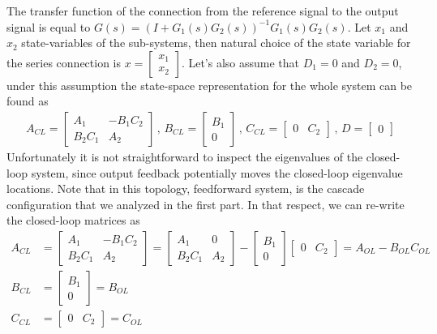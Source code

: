 \documentclass[twoside]{article}
\begin{document}
The transfer function of the connection from the reference signal to the output signal is equal to 
$G(s) = \left( I + G_1(s) G_2(s) \right)^{-1} G_1(s) G_2(s)$. Let $x_1$ and $x_2$
state-variables of the sub-systems, then natural choice of the state variable for the series connection is 
$x = \begin{bmatrix} x_1 \\ x_2 \end{bmatrix}$. Let's also assume that $D_1 = 0$ and $D_2 = 0$, under this assumption the state-space representation for the whole system can be found as
%
\begin{align*}
A_{CL} = \left[ \begin{array}{c|c} A_1 & -B_1 C_2 \\ \hline B_2 C_1  & A_2 \end{array} \right]
\, , \, B_{CL} = \left[ \begin{array}{c} B_1 \\ \hline 0  \end{array} \right]
\, , \, C_{CL} = \left[ \begin{array}{c|c} 0 & C_2  \end{array} \right]
\, , \, D = \left[ \begin{array}{c} 0 \end{array} \right]
\end{align*}
%
Unfortunately it is not straightforward to inspect the eigenvalues of the closed-loop system, since
output feedback potentially moves the closed-loop eigenvalue locations. Note that in this topology, 
feedforward system, is the cascade configuration that we analyzed in the first part. In that respect, we
can re-write the closed-loop matrices as
\begin{align*}
A_{CL} &= \left[ \begin{array}{c|c} A_1 & -B_1 C_2 \\ \hline B_2 C_1  & A_2 \end{array} \right]
= \left[ \begin{array}{c|c} A_1 & 0 \\ \hline B_2 C_1  & A_2 \end{array} \right] - \left[ \begin{array}{c} B_1 \\ \hline 0  \end{array} \right] \left[ \begin{array}{c|c} 0 & C_2  \end{array} \right] = A_{OL} - B_{OL} C_{OL}
\\ 
B_{CL} &= \left[ \begin{array}{c} B_1 \\ \hline 0  \end{array} \right] = B_{OL}
\\
C_{CL} &= \left[ \begin{array}{c|c} 0 & C_2  \end{array} \right] = C_{OL}
\end{align*}
\end{document}
